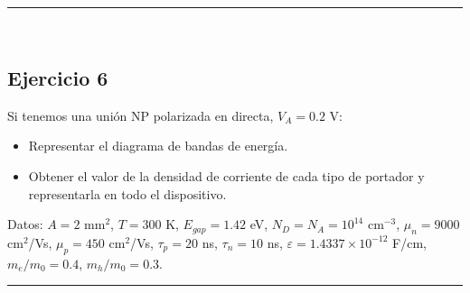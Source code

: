 \rule{\textwidth}{0.1pt} \\[2pt]
\subsection{Ejercicio 6} 

Si tenemos una unión NP polarizada en directa, $V_A = 0.2$ V:

\begin{itemize}
    \item Representar el diagrama de bandas de energía.
    \item Obtener el valor de la densidad de corriente de cada tipo de portador y representarla en todo el dispositivo.
\end{itemize}

Datos: $A = 2$ mm$^2$, $T = 300$ K, $E_{gap} = 1.42$ eV, $N_D = N_A = 10^{14}$ cm$^{-3}$, 
$\mu_n = 9000$ cm$^2$/Vs, $\mu_p = 450$ cm$^2$/Vs, $\tau_p = 20$ ns, $\tau_n = 10$ ns, 
$\varepsilon = 1.4337 \times 10^{-12}$ F/cm, $m_e/m_0 = 0.4$, $m_h/m_0 = 0.3$.


\rule{\textwidth}{0.1pt} \\[2pt]



